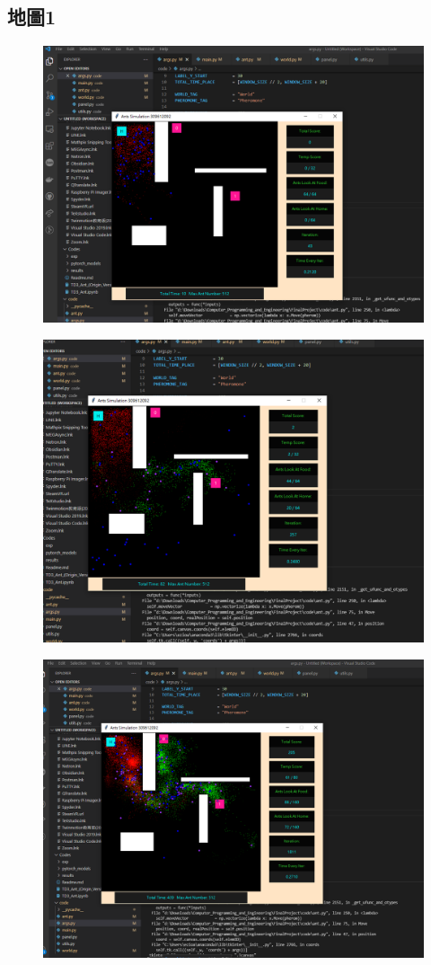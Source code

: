\documentclass[]{article}
\begin{document}
\clearpage
\subsection{地圖1}
\begin{figure}[htbp]
	\centering
	\includegraphics[width=0.9\linewidth]{../record1}
	\label{fig:record1}
\end{figure}
\begin{figure}[htbp]
	\centering
	\includegraphics[width=0.9\linewidth]{../record2}
	\label{fig:record2}
\end{figure}
\begin{figure}[htbp]
	\centering
	\includegraphics[width=0.9\linewidth]{../record3}
	\label{fig:record3}
\end{figure}
\end{document}
